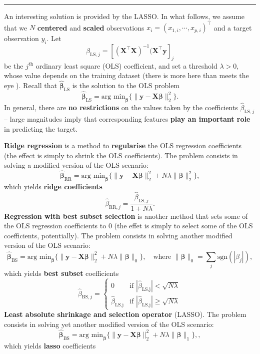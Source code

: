 \begin{center}
    \rule{0.5\textwidth}{.4pt}
\end{center}
An interesting solution is provided by the LASSO. In what follows, we assume that we $N$ \textbf{centered} and \textbf{scaled} observations $x_i=(x_{1,i},\cdots,x_{p,i})^{\!\top}$ and a target observation $y_i$. Let $$\hat{\beta}_{\textrm{LS},j}=[(\mathbf{X}^{\!\top}\mathbf{X})^{-1}(\mathbf{X}^{\!\top}\mathbf{y}]_j$$ be the $j^{\textrm{th}}$ ordinary least square (OLS) coefficient, and set a threshold $\lambda>0$, whose value depends on the training dataset (there is more here than meets the eye \cite{DSML_FS5}). Recall that $\hat{\mathbf{\beta}}_{\textrm{LS}}$ is the solution to the OLS problem $$\hat{\mathbf{\beta}}_{\textrm{LS}}=\textrm{arg min}_{\mathbf{\beta}}\{\|\mathbf{y}-\mathbf{X}\mathbf{\beta}\|_2^2\}.$$ In general, there are \textbf{no restrictions} on the values taken by the coefficients $\hat{\beta}_{\textrm{LS},j}$ -- large magnitudes imply that corresponding features \textbf{play an important role} in predicting the target. \par \textbf{Ridge regression} is a method to \textbf{regularise} the OLS regression coefficients (the effect is simply to shrink the OLS coefficients). The problem consists in solving a modified version of the OLS scenario: $$\hat{\mathbf{\beta}}_{\textrm{RR}}=\textrm{arg min}_{\mathbf{\beta}}\{\|\mathbf{y}-\mathbf{X}\mathbf{\beta}\|_2^2+N\lambda \|\mathbf{\beta}\|_2^2\},$$ which yields \textbf{ridge coefficients}
$$\hat{\beta}_{\textrm{RR},j}=\frac{\hat{\beta}_{\textrm{LS},j}}{1+N\lambda}.$$
\textbf{Regression with best subset selection} is another method that sets some of the OLS regression coefficients to 0 (the effet is simply to select some of the OLS coefficients, potentially). The problem consists in solving another modified version of the OLS scenario: $$\hat{\mathbf{\beta}}_{\textrm{BS}}=\textrm{arg min}_{\mathbf{\beta}}\{\|\mathbf{y}-\mathbf{X}\mathbf{\beta}\|_2^2+N\lambda \|\mathbf{\beta}\|_0\},\quad \mbox{where }\|\mathbf{\beta}\|_0=\sum_j\textrm{sgn}(|\beta_j|),$$ which yields \textbf{best subset} coefficients 
$$\hat{\beta}_{\textrm{BS},j}=\begin{cases} 0 & \text{if $|\hat{\beta}_{\textrm{LS,j}}|<\sqrt{N\lambda}$} \\ \hat{\beta}_{\textrm{LS,j}} & \text{if $|\hat{\beta}_{\textrm{LS,j}}|\geq\sqrt{N\lambda}$}\end{cases}$$
\textbf{Least absolute shrinkage and selection operator} (LASSO). The problem consists in solving yet another modified version of the OLS scenario: $$\hat{\mathbf{\beta}}_{\textrm{BS}}=\textrm{arg min}_{\mathbf{\beta}}\{\|\mathbf{y}-\mathbf{X}\mathbf{\beta}\|_2^2+N\lambda \|\mathbf{\beta}\|_1\},,$$ which yields \textbf{lasso} coefficients 
